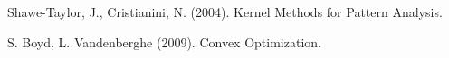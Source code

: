 \documentclass[twoside,twocolumn]{article}
\theoremstyle{plain}
\theoremstyle{definition}
\begin{document}

\begin{thebibliography}{99} %

Shawe-Taylor, J., Cristianini, N. (2004).
\newblock Kernel Methods for Pattern Analysis.

S. Boyd, L. Vandenberghe (2009).
\newblock Convex Optimization.
 
\end{thebibliography}

\end{document}
